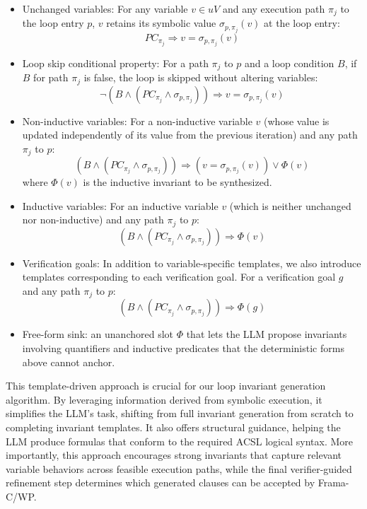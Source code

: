 \begin{itemize}
    \item Unchanged variables:
For any variable $v \in uV$ and any execution path $\pi_j$ to the loop entry $p$, $v$ retains its symbolic value $\sigma_{p, \pi_j}(v)$ at the loop entry:
\[ PC_{\pi_j} \Rightarrow v = \sigma_{p, \pi_j}(v) \]


\item Loop skip conditional property: 
For a path $\pi_j$ to $p$ and a loop condition $B$, if $B$ for path $\pi_j$ is false, the loop is skipped without altering variables:
\[\neg (B \land (PC_{\pi_j} \land \sigma_{p, \pi_j})) \Rightarrow v = \sigma_{p, \pi_j}(v)\]



\item Non-inductive variables: 
For a non-inductive variable $v$ (whose value is updated independently of its value from the previous iteration) and any path $\pi_j$ to $p$:
\[(B \land (PC_{\pi_j} \land \sigma_{p, \pi_j})) \Rightarrow (v = \sigma_{p, \pi_j}(v)) \lor \Phi(v)\]
where $\Phi(v)$ is the inductive invariant to be synthesized.


\item Inductive variables: 
For an inductive variable $v$ (which is neither unchanged nor non-inductive) and any path $\pi_j$ to $p$:
\[ (B \land (PC_{\pi_j} \land \sigma_{p, \pi_j})) \Rightarrow \Phi(v) \]

\item Verification goals:
In addition to variable-specific templates, we also introduce templates corresponding to each verification goal.
For a verification goal $g$ and any path $\pi_j$ to $p$:
\[ (B \land (PC_{\pi_j} \land \sigma_{p, \pi_j})) \Rightarrow \Phi(g)
\]

\item Free-form sink: an unanchored slot $\Phi$ that lets the LLM propose invariants involving quantifiers and inductive predicates that the deterministic forms above cannot anchor.

\end{itemize}









This template-driven approach is crucial for our loop invariant generation algorithm. By leveraging information derived from symbolic execution, it simplifies the LLM's task, shifting from full invariant generation from scratch to completing invariant templates. It also offers structural guidance, helping the LLM produce formulas that conform to the required ACSL logical syntax. More importantly, this approach encourages strong invariants that capture relevant variable behaviors across feasible execution paths, while the final verifier-guided refinement step determines which generated clauses can be accepted by Frama-C/WP.
